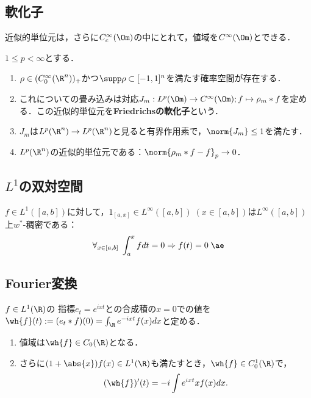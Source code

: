 \documentclass[uplatex, dvipdfmx]{jsreport}
\begin{document}
\subsection{軟化子}

\begin{tcolorbox}[colframe=ForestGreen, colback=ForestGreen!10!white,breakable,colbacktitle=ForestGreen!40!white,coltitle=black,fonttitle=\bfseries\sffamily,
title=]
    近似的単位元は，さらに$C_c^\infty(\Om)$の中にとれて，値域を$C^\infty(\Om)$とできる．
\end{tcolorbox}

\begin{theorem}
    $1\le p<\infty$とする．
    \begin{enumerate}
        \item $\rho\in (C^\infty_0(\R^n))_+$かつ$\supp\rho\subset[-1,1]^n$を満たす確率空間が存在する．
        \item これについての畳み込みは対応$J_m:L^p(\Om)\to C^\infty(\Om);f\mapsto\rho_m*f$を定める．この近似的単位元を\textbf{Friedrichsの軟化子}という．
        \item $J_m$は$L^p(\R^n)\to L^p(\R^n)$と見ると有界作用素で，$\norm{J_m}\le 1$を満たす．
        \item $L^p(\R^n)$の近似的単位元である：$\norm{\rho_m*f-f}_p\to0$．
    \end{enumerate}
\end{theorem}

\subsection{$L^1$の双対空間}

\begin{lemma}
    $f\in L^1([a,b])$に対して，$1_{[a,x]}\in L^\infty([a,b])\;(x\in[a,b])$は$L^\infty([a,b])$上$w^*$-稠密である：
    \[\forall_{x\in[a,b]}\;\int^x_afdt=0\Rightarrow f(t)=0\;\ae\]
\end{lemma}

\subsection{Fourier変換}

\begin{definition}
    $f\in L^1(\R)$の
    指標$e_t=e^{ixt}$との合成積の$x=0$での値を
    $\wh{f}(t):=(e_t*f)(0)=\int_\R e^{-ixt}f(x)dx$と定める．
\end{definition}

\begin{proposition}\mbox{}
    \begin{enumerate}
        \item 値域は$\wh{f}\in C_0(\R)$となる．
        \item さらに$(1+\abs{x})f(x)\in L^1(\R)$も満たすとき，$\wh{f}\in C_0^1(\R)$で，
        \[(\wh{f})'(t)=-i\int e^{ixt}xf(x)dx.\]
    \end{enumerate}
\end{proposition}
\end{document}
